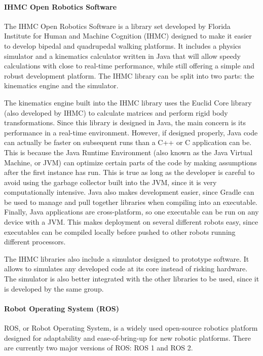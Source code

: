         \paragraph*{IHMC Open Robotics Software}
        The IHMC Open Robotics Software is a library set developed by Florida Institute for Human and Machine Cognition (IHMC) designed to make it easier to develop bipedal and quadrupedal walking platforms. It includes a physics simulator and a kinematics calculator written in Java that will allow speedy calculations with close to real-time performance, while still offering a simple and robust development platform. The IHMC library can be split into two parts: the kinematics engine and the simulator.

        The kinematics engine built into the IHMC library uses the Euclid Core library (also developed by IHMC) to calculate matrices and perform rigid body transformations. Since this library is designed in Java, the main concern is its performance in a real-time environment. However, if designed properly, Java code can actually be faster on subsequent runs than a C++ or C application can be. This is because the Java Runtime Environment (also known as the Java Virtual Machine, or JVM) can optimize certain parts of the code by making assumptions after the first instance has run. This is true as long as the developer is careful to avoid using the garbage collector built into the JVM, since it is very computationally intensive. Java also makes development easier, since Gradle can be used to manage and pull together libraries when compiling into an executable. Finally, Java applications are cross-platform, so one executable can be run on any device with a JVM. This makes deployment on several different robots easy, since executables can be compiled locally before pushed to other robots running different processors.

        The IHMC libraries also include a simulator designed to prototype software. It allows to simulates any developed code at its core instead of risking hardware. The simulator is also better integrated with the other libraries to be used, since it is developed by the same group.

        \paragraph*{Robot Operating System (ROS)}
        ROS, or Robot Operating System, is a widely used open-source robotics platform designed for adaptability and ease-of-bring-up for new robotic platforms. There are currently two major versions of ROS: ROS 1 and ROS 2.

